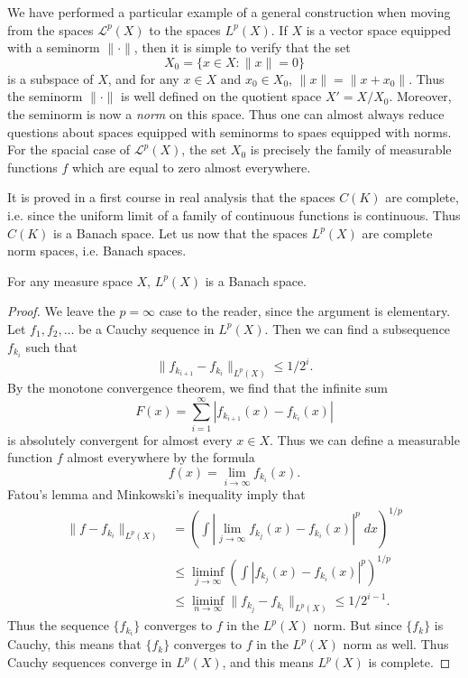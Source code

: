 \begin{remark}
    We have performed a particular example of a general construction when moving from the spaces $\mathcal{L}^p(X)$ to the spaces $L^p(X)$. If $X$ is a vector space equipped with a seminorm $\| \cdot \|$, then it is simple to verify that the set
    \[ X_0 = \{ x \in X: \| x \| = 0 \} \]
    is a subspace of $X$, and for any $x \in X$ and $x_0 \in X_0$, $\| x \| = \| x + x_0 \|$. Thus the seminorm $\| \cdot \|$ is well defined on the quotient space $X' = X/X_0$. Moreover, the seminorm is now a \emph{norm} on this space. Thus one can almost always reduce questions about spaces equipped with seminorms to spaes equipped with norms. For the spacial case of $\mathcal{L}^p(X)$, the set $X_0$ is precisely the family of measurable functions $f$ which are equal to zero almost everywhere.
\end{remark}

It is proved in a first course in real analysis that the spaces $C(K)$ are complete, i.e. since the uniform limit of a family of continuous functions is continuous. Thus $C(K)$ is a Banach space. Let us now that the spaces $L^p(X)$ are complete norm spaces, i.e. Banach spaces.

\begin{theorem}
    For any measure space $X$, $L^p(X)$ is a Banach space.
\end{theorem}
\begin{proof}
    We leave the $p = \infty$ case to the reader, since the argument is elementary. Let $f_1, f_2, \dots$ be a Cauchy sequence in $L^p(X)$. Then we can find a subsequence $f_{k_i}$ such that
    \[ \| f_{k_{i + 1}} - f_{k_i} \|_{L^p(X)} \leq 1/2^i. \]
    By the monotone convergence theorem, we find that the infinite sum
    \[ F(x) = \sum_{i = 1}^\infty | f_{k_{i+1}}(x) - f_{k_i}(x)| \]
    is absolutely convergent for almost every $x \in X$. Thus we can define a measurable function $f$ almost everywhere by the formula
    \[ f(x) = \lim_{i \to \infty} f_{k_i}(x). \]
    Fatou's lemma and Minkowski's inequality imply that
    \begin{align*}
        \| f - f_{k_i} \|_{L^p(X)} &= \left( \int \left| \lim_{j \to \infty} f_{k_j}(x) - f_{k_i}(x) \right|^p\; dx \right)^{1/p}\\
        &\leq \liminf_{j \to \infty} \left( \int \left| f_{k_j}(x) - f_{k_i}(x) \right|^p \right)^{1/p}\\
        &\leq \liminf_{n \to \infty} \| f_{k_j} - f_{k_i} \|_{L^p(X)} \leq 1/2^{i-1}.
    \end{align*}
    Thus the sequence $\{ f_{k_i} \}$ converges to $f$ in the $L^p(X)$ norm. But since $\{ f_k \}$ is Cauchy, this means that $\{ f_k \}$ converges to $f$ in the $L^p(X)$ norm as well. Thus Cauchy sequences converge in $L^p(X)$, and this means $L^p(X)$ is complete.
\end{proof}

